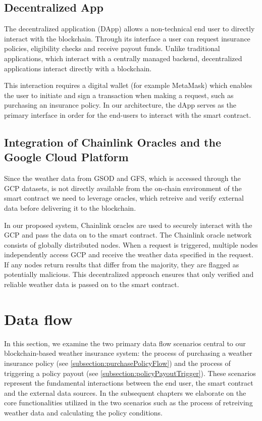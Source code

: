 \subsection{Decentralized App}\label{subsection:decentralizedApp}

The decentralized application (DApp) allows a non-technical end user to directly interact with the blockchain. Through its interface a user can request insurance policies, eligibility checks and receive payout funds. Unlike traditional applications, which interact with a centrally managed backend, decentralized applications interact directly with a blockchain.

This interaction requires a digital wallet (for example MetaMask) which enables the user to initiate and sign a transaction when making a request, such as purchasing an insurance policy. In our architecture, the dApp serves as the primary interface in order for the end-users to interact with the smart contract. 

\subsection{Integration of Chainlink Oracles and the Google Cloud Platform}\label{subsection:ChainlinkOracle}

Since the weather data from GSOD and GFS, which is accessed through the GCP datasets, is not directly available from the on-chain environment of the smart contract we need to leverage oracles, which retreive and verify external data before delivering it to the blockchain.

In our proposed system, Chainlink oracles are used to securely interact with the GCP and pass the data on to the smart contract. The Chainlink oracle network consists of globally distributed nodes. When a request is triggered, multiple nodes independently access GCP and receive the weather data specified in the request. If any nodes return results that differ from the majority, they are flagged as potentially malicious. This decentralized approach ensures that only verified and reliable weather data is passed on to the smart contract.

\section{Data flow}

In this section, we examine the two primary data flow scenarios central to our blockchain-based weather insurance system: the process of purchasing a weather insurance policy (see \cref{subsection:purchasePolicyFlow}) and the process of triggering a policy payout (see \cref{subsection:policyPayoutTrigger}). These scenarios represent the fundamental interactions between the end user, the smart contract and the external data sources. In the subsequent chapters we elaborate on the core functionalities utilized in the two scenarios such as the process of retreiving weather data and calculating the policy conditions.

